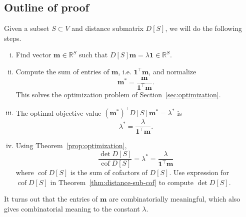\documentclass{amsart}
\theoremstyle{definition}
\newcommand{\RR}{\mathbb{R}}
\newcommand{\bone}{\mathbf{1}}
\newcommand{\boldm}{\mathbf{m}}
\newcommand{\tr}{\intercal}
\DeclareMathOperator{\cof}{cof}
\begin{document}
\subsection{Outline of proof} 
Given a  subset $S \subset V$ and distance submatrix $D[S]$, we will do the following steps.
\begin{enumerate}[(i)]
\item 
Find vector $\boldm \in \RR^S$ such that $D[S]\boldm = \lambda \mathbf{1} \in \RR^S$.

\item 
Compute the sum of entries of $\boldm$, i.e. $\mathbf{1}^\tr \boldm$, and normalize
\[
	\boldm^* = \frac{\boldm}{\bone^\tr \boldm}.
\]
This solves the optimization problem of Section~\ref{sec:optimization}.

\item 
The optimal objective value
$(\boldm^*)^\tr D[S] \boldm^* = \lambda^* $
is
\[
	\lambda^* = \frac{\lambda}{\bone^\tr \boldm}.
\]

\item 
Using Theorem~\ref{prop:optimization}, 
\[
\frac{\det D[S]}{\cof D[S]} 
= \lambda^*
= \frac{\lambda}{\mathbf{1}^\tr \boldm } 
\]
where $\cof D[S]$ is the sum of cofactors of $D[S]$.
Use expression for $\cof D[S]$ in Theorem~\ref{thm:distance-sub-cof} to compute $\det D[S]$.
\end{enumerate}
It turns out that the entries of $\boldm$ are combinatorially meaningful,
which also gives combinatorial meaning to
the constant $\lambda$.
\end{document}
